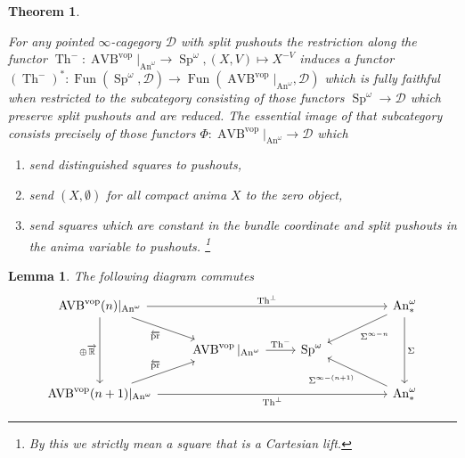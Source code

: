 \documentclass{article}
\newcommand{\R}{\mathbb{R}} %
\newcommand{\cD}{\mathcal{D}}
\newcommand{\cX}{\AVB^{\vop}}
\newcommand{\vop}{\mathrm{vop}}
\newcommand{\pr}{\mathrm{pr}}
\DeclareMathOperator{\AVB}{AVB}
\DeclareMathOperator{\An}{An}
\DeclareMathOperator{\Sp}{Sp}
\DeclareMathOperator{\Fun}{Fun}
\DeclareMathOperator{\Th}{Th}
\newtheorem{theorem}{Theorem}
\newtheorem{lemma}{Lemma}
\begin{document}
\begin{theorem}\label{thrm:dream}
    
    For any pointed $\infty$-cagegory $\cD$
    with split pushouts the restriction along the functor
    $\Th^- \colon \cX|_{\An^\omega} \to \Sp^\omega, (X,V) \mapsto X^{-V}$
    induces a functor
    $ (\Th^-)^* \colon \Fun(\Sp^\omega, \cD) \to \Fun(\cX|_{\An^\omega} , \cD)$
    which is fully faithful when restricted to the subcategory consisting of those
    functors $\Sp^\omega \to \cD$ which preserve split pushouts and are reduced.
    The essential image of that subcategory consists precisely of those functors
    $\Phi \colon \cX|_{\An^\omega}  \to \cD$ which
    \begin{enumerate}
      \item send distinguished squares to pushouts,
      \item send $(X,\emptyset)$ for all compact anima $X$ to the zero object,
      \item send squares which are constant in the bundle coordinate and split pushouts in the anima variable to pushouts. \footnote{By this we strictly mean a square that is a Cartesian lift.}
    \end{enumerate}
\end{theorem}

\begin{lemma}\label{lemma:reduction}
    The following diagram commutes 
    \[\begin{tikzcd}
        {\AVB^\vop(n)|_{\An^\omega}} && {} && {\An_*^\omega} \\
        & {\AVB^\vop|_{\An^\omega}} & {\Sp^\omega} \\
        {\AVB^\vop(n+1)|_{\An^\omega}} &&&& {\An_*^\omega}
        \arrow["{\Th^\perp}", from=1-1, to=1-5]
        \arrow["{\Th^\perp}"', from=3-1, to=3-5]
        \arrow["{\oplus \overrightarrow{\R}}"', from=1-1, to=3-1]
        \arrow["{\Th^-}", from=2-2, to=2-3]
        \arrow["\Sigma", from=1-5, to=3-5]
        \arrow["{\Sigma^{\infty-n}}", from=1-5, to=2-3]
        \arrow["{\Sigma^{\infty-(n+1)}}", from=3-5, to=2-3]
        \arrow["{\overleftarrow{\pr}}"', from=1-1, to=2-2]
        \arrow["{\overleftarrow{\pr}}", from=3-1, to=2-2]
    \end{tikzcd}\]
\end{lemma}
\end{document}
